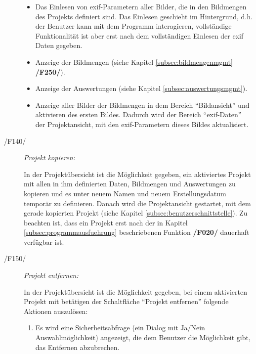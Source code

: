 \begin{description}
			\begin{itemize}
				
				\item Das Einlesen von \gls{exif}-Parametern aller Bilder, die in den Bildmengen des Projekts definiert sind. Das Einlesen geschieht im Hintergrund, d.h. der Benutzer kann mit dem Programm interagieren, vollständige Funktionalität ist aber erst nach dem vollständigen Einlesen der \gls{exif} Daten gegeben.
				
				\item Anzeige der Bildmengen (siehe Kapitel \ref{subsec:bildmengenmgmt} \textbf{/F250/}).
				
				\item Anzeige der Auswertungen (siehe Kapitel \ref{subsec:auswertungsmgmt}).
				
				\item Anzeige aller Bilder der Bildmengen in dem Bereich "`Bildansicht"' und aktivieren des ersten Bildes. Dadurch wird der Bereich "`\gls{exif}-Daten"' der Projektansicht, mit den \gls{exif}-Parametern dieses Bildes aktualisiert.
			
			\end{itemize}		
		
		\item[/F140/] \textit{Projekt kopieren:}\par In der Projektübersicht ist die Möglichkeit gegeben, ein aktiviertes Projekt mit allen in ihm definierten Daten, Bildmengen und Auswertungen zu kopieren und es unter neuem Namen und neuem Erstellungsdatum temporär zu definieren. Danach wird die Projektansicht gestartet, mit dem gerade kopierten Projekt (siehe Kapitel \ref{subsec:benutzerschnittstelle}). Zu beachten ist, dass ein Projekt erst nach der in Kapitel \ref{subsec:programmausfuehrung} beschriebenen Funktion \textbf{/F020/} dauerhaft verfügbar ist.
		
		\item[/F150/] \textit{Projekt entfernen:}\par In der Projektübersicht ist die Möglichkeit gegeben, bei einem aktivierten Projekt mit betätigen der Schaltfläche "`Projekt entfernen"' folgende Aktionen auszulösen:
			
			\begin{enumerate}
				
				\item Es wird eine Sicherheitsabfrage (ein Dialog mit Ja/Nein Auswahlmöglichkeit) angezeigt, die dem Benutzer die Möglichkeit gibt, das Entfernen abzubrechen.
				

\end{enumerate}
\end{description}
